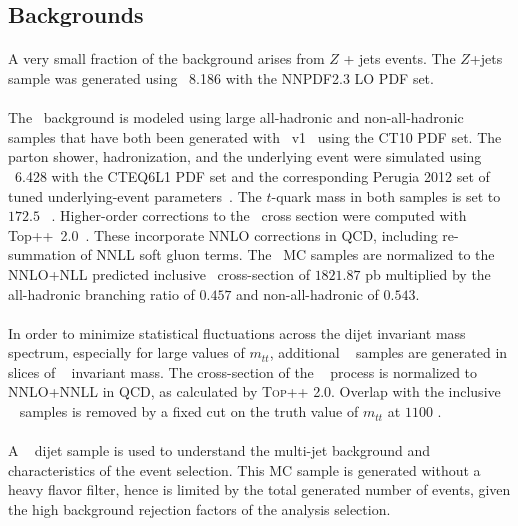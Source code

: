 \subsection{Backgrounds}
\paragraph{}
A very small fraction of the background arises from $Z$ + jets events. The $Z$+jets sample was generated using \pythia~8.186 with the NNPDF2.3 LO PDF set.

\paragraph{}
The \ttbar\ background is modeled using large all-hadronic and non-all-hadronic samples that have both been generated with \powhegbox\ v1~\cite{Alioli:2010xd} using the CT10 PDF set. 
The parton shower, hadronization, and the underlying event were simulated using \pythia~6.428 with the CTEQ6L1 PDF set and the corresponding Perugia 2012 set of tuned underlying-event parameters~\cite{Skands:2010ak}.
The $t$-quark mass in both samples is set to $172.5$ \GeV~.
Higher-order corrections to the \ttbar\ cross section were computed with Top++~2.0~\cite{Czakon:20142930}. These incorporate NNLO corrections in QCD, including re-summation of NNLL soft gluon terms.
The \ttbar\ MC samples are normalized to the NNLO+NLL predicted inclusive \ttbar\ cross-section of
$1821.87$ pb multiplied by the all-hadronic branching ratio of $0.457$ and non-all-hadronic of $0.543$.

\paragraph{}
In order to minimize statistical fluctuations across the dijet invariant mass spectrum, especially for large values of $m_{tt}$, additional \ttbar~ samples are generated in slices of \ttbar~ invariant mass. The cross-section of the \ttbar~ process is normalized to NNLO+NNLL in QCD, as calculated by \textsc{Top++} 2.0. Overlap with the inclusive \ttbar~ samples is removed by a fixed cut on the truth value of $m_{tt}$ at $1100$ \GeV.

\paragraph{}
A \pythia~ dijet sample is used to understand the multi-jet background and characteristics of the event selection. This MC sample is generated without a heavy flavor filter, hence is limited by the total generated number of events, given the high background rejection factors of the analysis selection.











